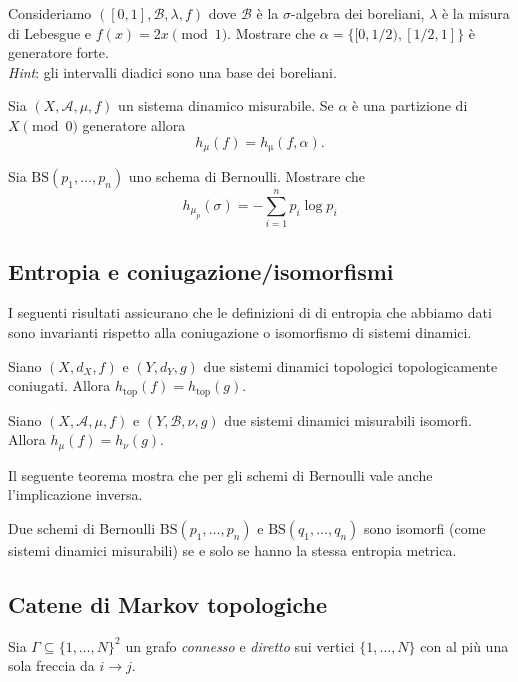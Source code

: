 \begin{exercise}
    Consideriamo $ ([0,1], \mathcal{B}, \lambda, f) $ dove $ \mathcal{B} $ è la $ \sigma $-algebra dei boreliani, $ \lambda $ è la misura di Lebesgue e $ f(x) = 2x \pmod{1} $. Mostrare che $ \alpha = \{[0, 1/2), [1/2, 1]\} $ è generatore forte. \\
    \emph{Hint}: gli intervalli diadici sono una base dei boreliani.
\end{exercise}

\begin{thm}
     Sia $ (X, \mathcal{A}, \mu, f) $ un sistema dinamico misurabile. Se $ \alpha $ è una partizione di $ X \pmod{0} $ generatore allora
    \[
        h_{\mu}(f) = h_{\mathrm{\mu}}(f, \alpha).
    \]
\end{thm}

\begin{exercise}
    Sia $ \mathrm{BS}(p_1, \ldots, p_{n}) $ uno schema di Bernoulli. Mostrare che
    \[
        h_{\mu_p}(\sigma) = -\sum_{i=1}^{n} p_i\log{p_i}
    \]
\end{exercise}

\subsection{Entropia e coniugazione/isomorfismi}
I seguenti risultati assicurano che le definizioni di di entropia che abbiamo dati sono invarianti rispetto alla coniugazione o isomorfismo di sistemi dinamici.
\begin{thm}
    Siano $ (X, d_X, f) $ e $ (Y, d_Y, g) $ due sistemi dinamici topologici topologicamente coniugati. Allora $ h_{\mathrm{top}}(f) = h_{\mathrm{top}}(g) $.
\end{thm}
\begin{thm}
    Siano $ (X, \mathcal{A}, \mu, f) $ e $ (Y, \mathcal{B}, \nu, g) $ due sistemi dinamici misurabili isomorfi. Allora $ h_\mu(f) = h_\nu(g) $.
\end{thm}
Il seguente teorema mostra che per gli schemi di Bernoulli vale anche l'implicazione inversa.
\begin{thm}[Ornstein]
    Due schemi di Bernoulli $ \mathrm{BS}(p_1, \ldots, p_n) $ e $ \mathrm{BS}(q_1,\ldots,q_n) $ sono isomorfi (come sistemi dinamici misurabili) se e solo se hanno la stessa entropia metrica.
\end{thm}

\subsection{Catene di Markov topologiche}
Sia $ \Gamma \subseteq \{1, \ldots, N\}^{2} $ un grafo \emph{connesso} e \emph{diretto} sui vertici $ \{1, \ldots, N\} $ con al più una sola freccia da $ i \to j $.
